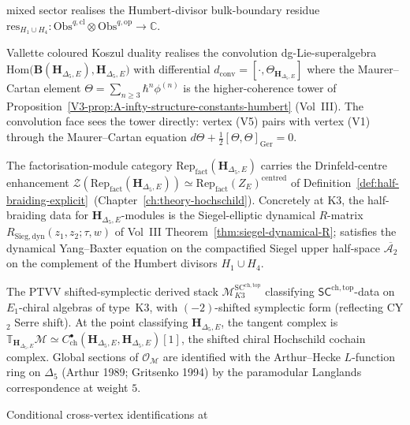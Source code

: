 \begin{theorem}
\begin{description}
 mixed sector realises the Humbert-divisor bulk-boundary residue
 $\mathrm{res}_{H_1 \cup H_4}\colon
 \mathrm{Obs}^{q,\mathrm{cl}} \otimes \mathrm{Obs}^{q,\mathrm{op}} \to
 \mathbb{C}$.
 \item[(V5) Convolution face.] Vallette coloured Koszul duality
 realises the convolution dg-Lie-superalgebra
 $\mathrm{Hom}\bigl(\mathbf{B}(\mathbf{H}_{\Delta_5,E}),
 \mathbf{H}_{\Delta_5,E}\bigr)$ with differential $d_{\mathrm{conv}} =
 [\cdot, \Theta_{\mathbf{H}_{\Delta_5,E}}]$ where the Maurer--Cartan
 element $\Theta = \sum_{n \geq 3} \hbar^n \phi^{(n)}$ is the
 higher-coherence tower of
 Proposition~\ref{V3-prop:A-infty-structure-constants-humbert} (Vol~III).
 The convolution face sees the tower directly: vertex (V5) pairs with
 vertex (V1) through the
 Maurer--Cartan equation
 $d \Theta + \frac{1}{2} [\Theta, \Theta]_{\mathrm{Ger}} = 0$.
 \item[(V6) Drinfeld-centre face.] The factorisation-module category
 $\mathrm{Rep}_{\mathrm{fact}}(\mathbf{H}_{\Delta_5,E})$ carries the
 Drinfeld-centre enhancement
 $\mathcal{Z}(\mathrm{Rep}_{\mathrm{fact}}(\mathbf{H}_{\Delta_5,E})) \simeq
 \mathrm{Rep}_{\mathrm{fact}}(Z_E)^{\mathrm{centred}}$
 of
 Definition~\ref{def:half-braiding-explicit}~(Chapter~\ref{ch:theory-hochschild}).
 Concretely at K3, the half-braiding data for
 $\mathbf{H}_{\Delta_5,E}$-modules is the Siegel-elliptic dynamical
 $R$-matrix $R_{\mathrm{Sieg,dyn}}(z_1, z_2; \tau, w)$ of Vol~III
 Theorem~\ref{thm:siegel-dynamical-R}; satisfies the dynamical
 Yang--Baxter equation on the compactified Siegel upper half-space
 $\overline{\mathcal{A}_2}$ on the complement of the Humbert divisors
 $H_1 \cup H_4$.
 \item[(V7) Derived-algebraic-geometry face.] The PTVV shifted-symplectic
 derived stack
 $\mathcal{M}^{\mathrm{SC}^{\mathrm{ch,top}}}_{K3}$ classifying
 $\mathsf{SC}^{\mathrm{ch,top}}$-data on $E_1$-chiral algebras of
 type~K3, with $(-2)$-shifted symplectic form (reflecting CY$_2$ Serre
 shift). At the point classifying $\mathbf{H}_{\Delta_5,E}$, the tangent
 complex is
 $\mathbb{T}_{\mathbf{H}_{\Delta_5,E}} \mathcal{M} \simeq
 C^\bullet_{\mathrm{ch}}(\mathbf{H}_{\Delta_5,E}, \mathbf{H}_{\Delta_5,E})[1]$,
 the shifted chiral Hochschild cochain complex. Global sections of
 $\mathcal{O}_{\mathcal{M}}$ are identified with the Arthur--Hecke
 $L$-function ring on $\Delta_5$ (Arthur 1989; Gritsenko 1994) by the
 paramodular Langlands correspondence at weight $5$.
\end{description}
Conditional cross-vertex identifications at

\end{theorem}
